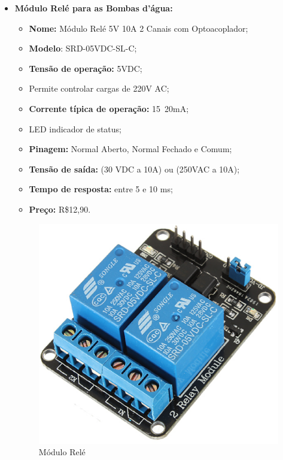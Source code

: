 \begin{itemize}
	\item \textbf{Módulo Relé para as Bombas d'água:}
	\begin{itemize}
		\item \textbf{Nome:} Módulo Relé 5V 10A 2 Canais com Optoacoplador;
		\item \textbf{Modelo}: SRD-05VDC-SL-C;
		\item \textbf{Tensão de operação:} 5VDC;
		\item Permite controlar cargas de 220V AC;
		\item \textbf{Corrente típica de operação:} 15~20mA;
		\item LED indicador de status;
		\item \textbf{Pinagem:} Normal Aberto, Normal Fechado e Comum;
		\item \textbf{Tensão de saída:} (30 VDC a 10A) ou (250VAC a 10A);
		\item \textbf{Tempo de resposta:} entre 5 e 10 ms;
		\item \textbf{Preço:} R\$12,90.
	\end{itemize} 
	
\begin{figure}[!htb]                   
	\centering                          
	\includegraphics[scale=0.3]{figuras/Figura_10.eps}
	\caption{Módulo Relé}               
\end{figure}	

\end{itemize}
